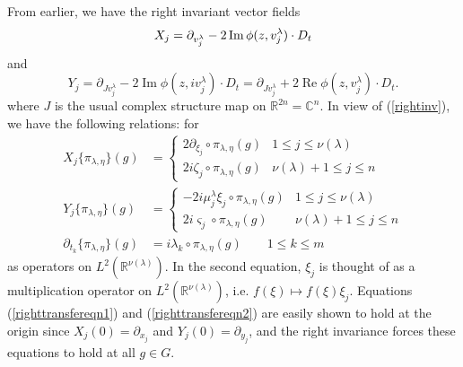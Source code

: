 \documentclass[12pt,reqno]{amsart}
\theoremstyle{definition}
\begin{document}
From earlier,  we have the right invariant vector fields
\[
X_j=\partial_{v^\lambda_j} - 2 \operatorname{Im} \phi (z,v^\lambda_j) \cdot D_t \\
\]
and
\[
Y_j =\partial_{Jv^\lambda_j} - 2 \operatorname{Im} \phi (z,iv^\lambda_j) \cdot D_t = \partial_{Jv^\lambda_j} +2\operatorname{Re}\phi (z,v^\lambda_j) \cdot D_t.
\]
where $J$ is the usual complex structure map on ${\mathbb{R}}^{2n} = {\mathbb{C}}^n$.
In view of (\ref{rightinv}),
we have the following relations: for 
\begin{align}
\label{righttransfereqn1}
 X_j \{\pi_{\lambda,\eta} \} (g) & = \begin{cases}  2 {\partial}_{\xi_j} \circ \pi_{\lambda,\eta} (g)    & 1 \leq j \leq {\nu(\lambda)} \\
                               2i \zeta_j \circ \pi_{\lambda,\eta} (g) & {\nu(\lambda)}+1\leq j \leq n      \end{cases} \\
\label{righttransfereqn2}
Y_j \{\pi_{\lambda,\eta} \} (g)  &= \begin{cases} -2i {\mu^\lambda_j} \xi_j  \circ  \pi_{\lambda,\eta} (g)	& 1 \leq j \leq {\nu(\lambda)} \\
				2i \varsigma_j \circ \pi_{\lambda,\eta} (g) & {\nu(\lambda)}+1\leq j \leq n      \end{cases} \\
\label{righttransfereqn3}
{\partial}_{t_k}\{\pi_{\lambda,\eta} \}(g)   &= i \lambda_k  \circ  \pi_{\lambda,\eta} (g) \qquad 1\leq k \leq m
\end{align}
as operators on $L^2({\mathbb{R}}^{\nu(\lambda)})$. 
In the second equation, $\xi_j$ 
is thought of as a multiplication operator on $L^2({\mathbb{R}}^{\nu(\lambda)})$,
i.e. $f(\xi) \mapsto f(\xi) \xi_j$. Equations
(\ref{righttransfereqn1}) and (\ref{righttransfereqn2})
are easily shown to hold 
at the origin since $X_j (0) = {\partial}_{x_j}$
and $Y_j (0)= {\partial}_{y_j}$, and the right invariance forces these
equations to hold at all $g \in G$.
\end{document}
